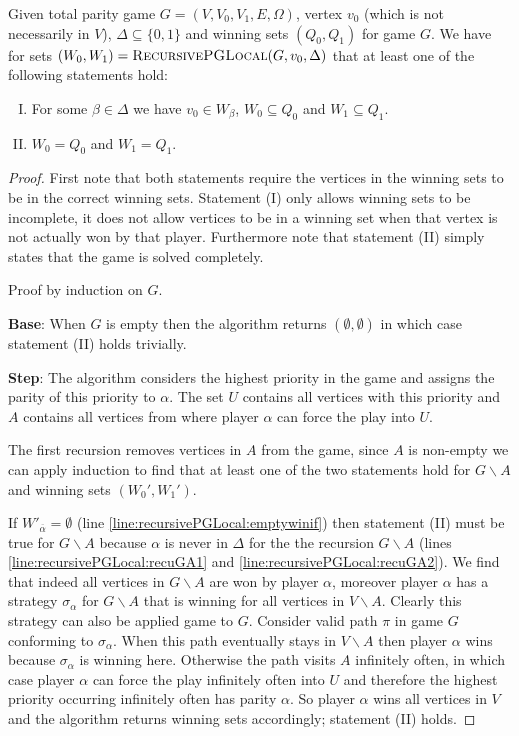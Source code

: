 \begin{theorem}
	\label{the_local_zlnk_correct}
	Given total parity game $G = (V,V_0,V_1,E,\Omega)$, vertex $v_0$ (which is not necessarily in $V$), $\Delta \subseteq \{0,1\}$ and winning sets $(Q_0,Q_1)$ for game $G$. We have for sets $(W_0,W_1) = \textsc{RecursivePGLocal}(G,v_0,\Delta)$ that at least one of the following statements hold:
	\begin{enumerate}[(I)]
		\item For some $\beta \in \Delta$ we have $v_0 \in W_\beta$, $W_0 \subseteq Q_0$ and $W_1 \subseteq Q_1$.
		\item $W_0 = Q_0$ and $W_1 = Q_1$.
	\end{enumerate}
		\begin{proof}
			First note that both statements require the vertices in the winning sets to be in the correct winning sets. Statement (I) only allows winning sets to be incomplete, it does not allow vertices to be in a winning set when that vertex is not actually won by that player. Furthermore note that statement (II) simply states that the game is solved completely.
			
			Proof by induction on $G$. 
			
			\textbf{Base}: When $G$ is empty then the algorithm returns $(\emptyset, \emptyset)$ in which case statement (II) holds trivially.
			
			\textbf{Step}: The algorithm considers the highest priority in the game and assigns the parity of this priority to $\alpha$. The set $U$ contains all vertices with this priority and $A$ contains all vertices from where player $\alpha$ can force the play into $U$.
			
			The first recursion removes vertices in $A$ from the game, since $A$ is non-empty we can apply induction to find that at least one of the two statements hold for $G\backslash A$ and winning sets $(W_0',W_1')$.
			
			If $W'_{\overline{\alpha}} = \emptyset$ (line \ref{line:recursivePGLocal:emptywinif}) then statement (II) must be true for $G \backslash A$ because $\alpha$ is never in $\Delta$ for the the recursion $G \backslash A$ (lines \ref{line:recursivePGLocal:recuGA1} and \ref{line:recursivePGLocal:recuGA2}). We find that indeed all vertices in $G\backslash A$ are won by player $\alpha$, moreover player $\alpha$ has a strategy $\sigma_\alpha$ for $G\backslash A$ that is winning for all vertices in $V\backslash A$. Clearly this strategy can also be applied game to $G$. Consider valid path $\pi$ in game $G$ conforming to $\sigma_\alpha$. When this path eventually stays in $V \backslash A$ then player $\alpha$ wins because $\sigma_\alpha$ is winning here. Otherwise the path visits $A$ infinitely often, in which case player $\alpha$ can force the play infinitely often into $U$ and therefore the highest priority occurring infinitely often has parity $\alpha$. So player $\alpha$ wins all vertices in $V$ and the algorithm returns winning sets accordingly; statement (II) holds.
			

\end{proof}
\end{theorem}

